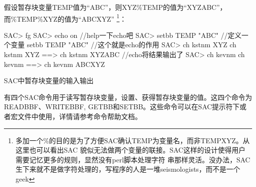 假设暂存块变量TEMP值为``ABC''，则XYZ\%TEMP的值为``XYZABC''，而\%TEMP\%XYZ的值为``ABCXYZ''
\footnote{多加一个\%的目的是为了方便SAC确认TEMP为变量名，而非TEMPXYZ。从这里也可以看出SAC
貌似无法做两个变量的联接。SAC这样的设计使得用户需要记忆更多的规则，显然没有perl脚本处理字符
串那样灵活。没办法，SAC生下来就不是做字符处理的，写程序的人是一堆seismologists，而不是一个geek}：
\begin{SACCode}
SAC> fg 
SAC> echo on           //help一下echo吧
SAC> setbb TEMP "ABC"  //定义一个变量
 setbb TEMP "ABC"      //这个就是echo的作用
SAC> ch kstnm XYZ%
 ch kstnm XYZ%
 ==> ch kstnm XYZABC   //echo将结果输出了
SAC> ch kevnm %
 ch kevnm %
 ==> ch kevnm ABCXYZ
\end{SACCode}

SAC中暂存块变量的输入输出

有四个SAC命令用于读写暂存块变量，设置、获得暂存块变量的值。这四个命令为READBBF、WRITEBBF,
GETBB和SETBB。这些命令可以在SAC提示符下或者宏文件中使用，详情请参考命令帮助文档。

